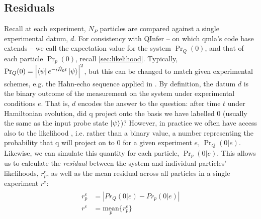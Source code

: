 \subsection{Residuals}\label{sec:residuals}
Recall at each experiment, $N_P$ particles are compared against a single experimental datum, $d$. 
For consistency with QInfer \cite{qinfer-1_0} -- on which \gls{qmla}'s code base extends --
    we call the expectation value for the system $\Pr_Q(0)$, 
    and that of each particle $\Pr_p(0)$, recall \cref{sec:likelihood}. 
Typically, $\Pr_Q(0) = \left| \bra{\psi} e^{-i\hat{H}_0 t} \ket{\psi} \right|^2$, 
    but this can be changed to match given experimental schemes, 
    e.g. the Hahn-echo sequence applied in \cite{gentile2020learning}. 
By definition, the datum $d$ is the binary outcome of the measurement on the system under experimental conditions $e$.
That is, $d$ encodes the answer to the question: 
    after time $t$ under Hamiltonian evolution, did \gls{q} project onto 
    the basis we have labelled $0$ (usually the same as the input probe state $\ket{\psi}$)?
However, in practice we often have access also to the \gls{likelihood} , 
    i.e. rather than a binary value, a number representing the probability that 
    \gls{q} will project on to $0$ for a given experiment $e$, $\Pr_Q(0 | e)$. 
Likewise, we can simulate this quantity for each particle, $\Pr_p(0 | e)$. 
This allows us to calculate the \emph{residual} between the system and individual particles' likelihoods, 
    $r_p^e$, as well as the mean residual across all particles in a single experiment $r^e$:
\begin{align}
    \label{eqn:particle_residual}
    \begin{split}
    r_p^e & = \left| Pr_Q(0 | e) - Pr_p(0 | e) \right|  \\
    r^e &= \underset{p}{\text{mean}} \{r_p^e\}
    \end{split}
\end{align}
\par 

